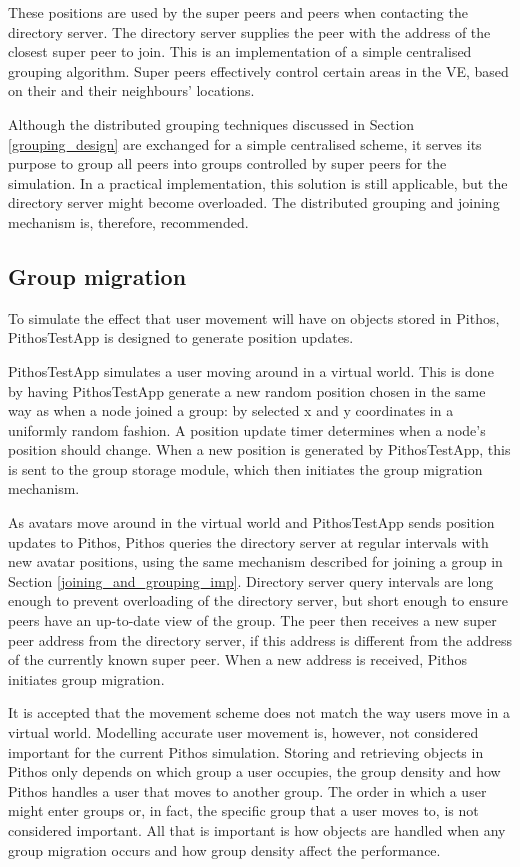 These positions are used by the super peers and peers when contacting the directory server. The directory server supplies the peer with the address of the closest super peer to join. This is an implementation of a simple centralised grouping algorithm. Super peers effectively control certain areas in the VE, based on their and their neighbours' locations.

Although the distributed grouping techniques discussed in Section \ref{grouping_design} are exchanged for a simple centralised scheme, it serves its purpose to group all peers into groups controlled by super peers for the simulation. In a practical implementation, this solution is still applicable, but the directory server might become overloaded. The distributed grouping and joining mechanism is, therefore, recommended.

\subsection{Group migration}
\label{group_migration_implementation}

To simulate the effect that user movement will have on objects stored in Pithos, PithosTestApp is designed to generate position updates.

PithosTestApp simulates a user moving around in a virtual world. This is done by having PithosTestApp generate a new random position chosen in the same way as when a node joined a group: by selected x and y coordinates in a uniformly random fashion. A position update timer determines when a node's position should change. When a new position is generated by PithosTestApp, this is sent to the group storage module, which then initiates the group migration mechanism.

As avatars move around in the virtual world and PithosTestApp sends position updates to Pithos, Pithos queries the directory server at regular intervals with new avatar positions, using the same mechanism described for joining a group in Section \ref{joining_and_grouping_imp}. Directory server query intervals are long enough to prevent overloading of the directory server, but short enough to ensure peers have an up-to-date view of the group. The peer then receives a new super peer address from the directory server, if this address is different from the address of the currently known super peer. When a new address is received, Pithos initiates group migration.

It is accepted that the movement scheme does not match the way users move in a virtual world. Modelling accurate user movement is, however, not considered important for the current Pithos simulation. Storing and retrieving objects in Pithos only depends on which group a user occupies, the group density and how Pithos handles a user that moves to another group. The order in which a user might enter groups or, in fact, the specific group that a user moves to, is not considered important. All that is important is how objects are handled when any group migration occurs and how group density affect the performance.

